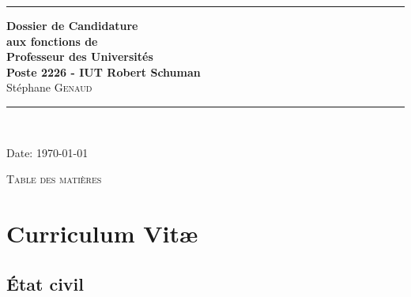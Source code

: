 \documentclass[11pt]{article}
\begin{document}
\thispagestyle{empty}




\rule{\linewidth}{1mm}
\begin{center}
\Large{\textbf{Dossier de Candidature\\
aux fonctions de \\
Professeur des Universités\\
Poste 2226 - IUT Robert Schuman}}\\[5mm]
\Large{Stéphane \textsc{Genaud}}\\[1cm]

\rule{\linewidth}{1mm}
\\
\vspace{3cm}
\end{center}
\begin{center}
Date: \today\\
\end{center}

\newpage
\mbox{}%

\setlength{\parindent}{5mm} %
\setlength{\parindent}{0mm}
\newpage


\begin{center}
\huge{\textsc{Table des matières}}
\end{center}
\vspace{2cm}


\tableofcontents

\noindent


\newpage



\section{Curriculum Vit{\ae}}

\setlength{\tabcolsep}{5pt}

\subsection{\'Etat civil}

\medskip
\end{document}
